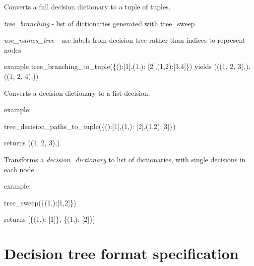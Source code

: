 \documentclass[a4paper,10pt,english]{sphinxmanual}
\begin{document}
\begin{fulllineitems}
	\label{index:chondro.tree_branching_to_tuple}
	Converts a full decision dictionary to a tuple of tuples.
	
	\emph{tree\_branching} - list of dictionaries generated with tree\_sweep
	
	\emph{use\_names\_tree} - use labels from decision tree     rather than indices to represent nodes
	
	example
	tree\_branching\_to\_tuple(\{():{[}1{]},(1,): {[}2{]},(1,2):{[}3,4{]}\})
	yields
	(((1, 2, 3),), ((1, 2, 4),))
	
\end{fulllineitems}


\begin{fulllineitems}
	\label{index:chondro.tree_decision_paths_to_tuple}
	Converts a decision dictionary to a list decision.
	
	example:
	
	tree\_decision\_paths\_to\_tuple(\{():{[}1{]},(1,): {[}2{]},(1,2):{[}3{]}\})
	
	returns ((1, 2, 3),)
	
\end{fulllineitems}


\begin{fulllineitems}
	\label{index:chondro.tree_sweep}
	Transforms a \emph{decision\_dictionary} to list of dictionaries,
	with single decisions in each node.
	
	example:
	
	tree\_sweep(\{(1,):{[}1,2{]}\})
	
	returns {[}\{(1,): {[}1{]}\}, \{(1,): {[}2{]}\}{]}
	
\end{fulllineitems}


\section{Decision tree format specification}\label{sec:jsonschema}
\end{document}
